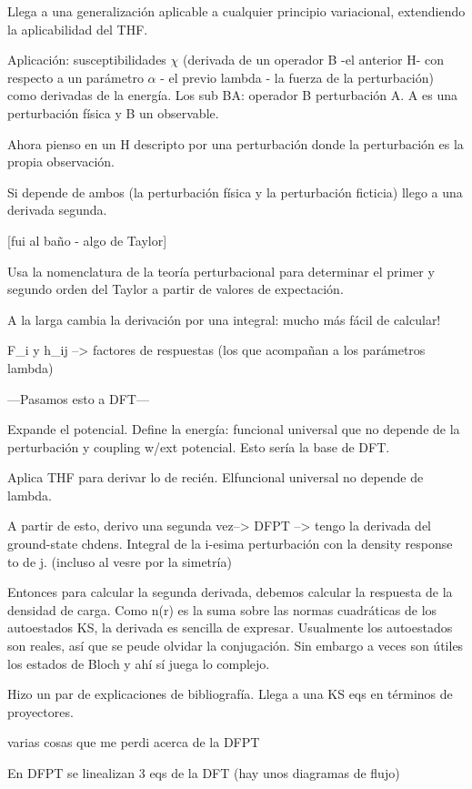   Llega a una generalización aplicable a cualquier principio variacional, extendiendo la aplicabilidad del THF.

  Aplicación: susceptibilidades $\chi$ (derivada de un operador B -el anterior H- con respecto a un parámetro $\alpha$ - el previo lambda - la fuerza de la perturbación) como derivadas de la energía. Los sub BA: operador B perturbación A. A es una perturbación física y B un observable.

  Ahora pienso en un H descripto por una perturbación donde la perturbación es la propia observación.

  Si depende de ambos (la perturbación física y la perturbación ficticia) llego a una derivada segunda.

  [fui al baño - algo de Taylor]

  Usa la nomenclatura de la teoría perturbacional para determinar el primer y segundo orden del Taylor a partir de valores de expectación.

  A la larga cambia la derivación por una integral: mucho más fácil de calcular!

  F_i y h_ij --> factores de respuestas (los que acompañan a los parámetros lambda)

  ---Pasamos esto a DFT---

  Expande el potencial. Define la energía: funcional universal que no depende de la perturbación y coupling w/ext potencial. Esto sería la base de DFT.

  Aplica THF para derivar lo de recién. Elfuncional universal no depende de lambda.

  A partir de esto, derivo una segunda vez--> DFPT --> tengo la derivada del ground-state chdens. Integral de la i-esima perturbación con la density response to de j. (incluso al vesre por la simetría)

  Entonces para calcular la segunda derivada, debemos calcular la respuesta de la densidad de carga. Como n(r) es la suma sobre las normas cuadráticas de los autoestados KS, la derivada es sencilla de expresar. Usualmente los autoestados son reales, así que se peude olvidar la conjugación. Sin embargo a veces son útiles los estados de Bloch y ahí sí juega lo complejo.

  Hizo un par de explicaciones de bibliografía. Llega a una KS eqs en términos de proyectores.

  varias cosas que me perdi acerca de la DFPT

  En DFPT se linealizan 3 eqs de la DFT (hay unos diagramas de flujo)

